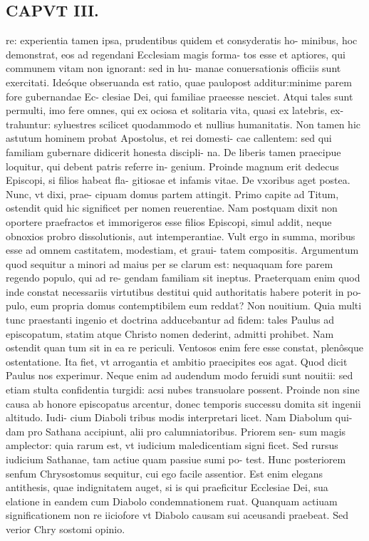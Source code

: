 \documentclass{article}
\begin{document}
\begin{pages}
\section*{CAPVT III. }
\marginpar{[ p.35 ]}\pstart re: experientia tamen ipsa, prudentibus quidem et consyderatis ho- minibus, hoc demonstrat, eos ad regendani Ecclesiam magis forma- tos esse et aptiores, qui communem vitam non ignorant: sed in hu- manae conuersationis officiis sunt exercitati. Ideóque obseruanda est ratio, quae paulopost additur:minime parem fore gubernandae Ec- clesiae Dei, qui familiae praeesse nesciet. Atqui tales sunt permulti, imo fere omnes, qui ex ociosa et solitaria vita, quasi ex latebris, ex- trahuntur: syluestres scilicet quodammodo et nullius humanitatis. Non tamen hic astutum hominem probat Apostolus, et rei domesti- cae callentem: sed qui familiam gubernare didicerit honesta discipli- na. De liberis tamen praecipue loquitur, qui debent patris referre in- genium. Proinde magnum erit dedecus Episcopi, si filios habeat fla- gitiosae et infamis vitae. De vxoribus aget postea. Nunc, vt dixi, prae- cipuam domus partem attingit. Primo capite ad Titum, ostendit quid hic significet per nomen reuerentiae. Nam postquam dixit non oportere praefractos et immorigeros esse filios Episcopi, simul addit, neque obnoxios probro dissolutionis, aut intemperantiae. Vult ergo in summa, moribus esse ad omnem castitatem, modestiam, et graui- tatem compositis. Argumentum quod sequitur a minori ad maius per se clarum est: nequaquam fore parem regendo populo, qui ad re- gendam familiam sit ineptus. Praeterquam enim quod inde constat necessariis virtutibus destitui quid authoritatis habere poterit in po- pulo, eum propria domus contemptibilem eum reddat?  \pend\pstart Non nouitium. Quia multi tunc praestanti ingenio et doctrina adducebantur ad fidem: tales Paulus ad episcopatum, statim atque Christo nomen dederint, admitti prohibet. Nam ostendit quan tum sit in ea re periculi. Ventosos enim fere esse constat, plenôsque ostentatione. Ita fiet, vt arrogantia et ambitio praecipites eos agat. Quod dicit Paulus nos experimur. Neque enim ad audendum modo feruidi sunt nouitii: sed etiam stulta confidentia turgidi: acsi nubes transuolare possent. Proinde non sine causa ab honore episcopatus arcentur, donec temporis successu domita sit ingenii altitudo. Iudi- cium Diaboli tribus modis interpretari licet. Nam Diabolum qui- dam pro Sathana accipiunt, alii pro calumniatoribus. Priorem sen- sum magis amplector: quia rarum est, vt iudicium maledicentiam signi ficet. Sed rursus iudicium Sathanae, tam actiue quam passiue sumi po- test. Hunc posteriorem senfum Chrysostomus sequitur, cui ego facile assentior. Est enim elegans antithesis, quae indignitatem auget, si is qui praeficitur Ecclesiae Dei, sua elatione in eandem cum Diabolo condemnationem ruat. Quanquam actiuam significationem non re iiciofore vt Diabolo causam sui aceusandi praebeat. Sed verior Chry sostomi opinio.  \pend

\end{pages}
\end{document}
